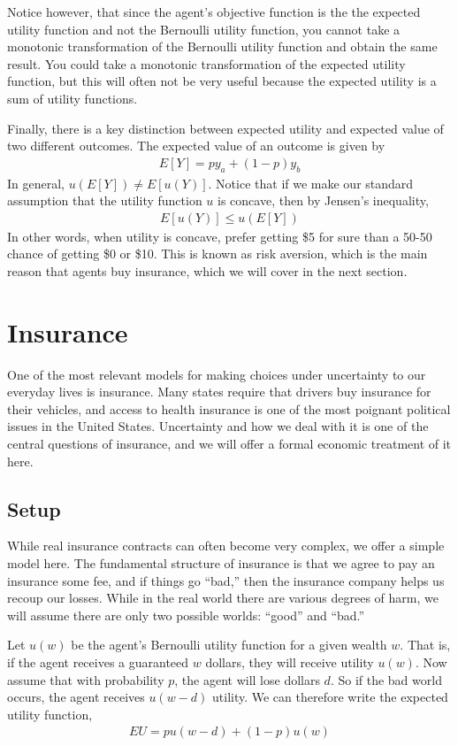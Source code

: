Notice however, that since the agent's objective function is the the expected utility function and not the Bernoulli utility function, you cannot take a monotonic transformation of the Bernoulli utility function and obtain the same result. You could take a monotonic transformation of the expected utility function, but this will often not be very useful because the expected utility is a sum of utility functions.

Finally, there is a key distinction between expected utility and expected value of two different outcomes. The expected value of an outcome is given by
\begin{align*}
    E[Y] = p y_a + (1 - p) y_b
\end{align*}
In general, $u(E[Y]) \neq E[u(Y)]$. Notice that if we make our standard assumption that the utility function $u$ is concave, then by Jensen's inequality,
\begin{align*}
    E[u(Y)] \leq u(E[Y])
\end{align*}
In other words, when utility is concave, prefer getting \$5 for sure than a 50-50 chance of getting \$0 or \$10. This is known as risk aversion, which is the main reason that agents buy insurance, which we will cover in the next section.

\section{Insurance}
One of the most relevant models for making choices under uncertainty to our everyday lives is insurance. Many states require that drivers buy insurance for their vehicles, and access to health insurance is one of the most poignant political issues in the United States. Uncertainty and how we deal with it is one of the central questions of insurance, and we will offer a formal economic treatment of it here. 

\subsection*{Setup}
While real insurance contracts can often become very complex, we offer a simple model here. The fundamental structure of insurance is that we agree to pay an insurance some fee, and if things go ``bad,'' then the insurance company helps us recoup our losses. While in the real world there are various degrees of harm, we will assume there are only two possible worlds: ``good'' and ``bad.''

Let $u(w)$ be the agent's Bernoulli utility function for a given wealth $w$. That is, if the agent receives a guaranteed $w$ dollars, they will receive utility $u(w)$. Now assume that with probability $p$, the agent will lose dollars $d$. So if the bad world occurs, the agent receives $u(w - d)$ utility. We can therefore write the expected utility function,
\begin{align*}
    EU = p u(w - d) + (1 - p)u(w)
\end{align*}

